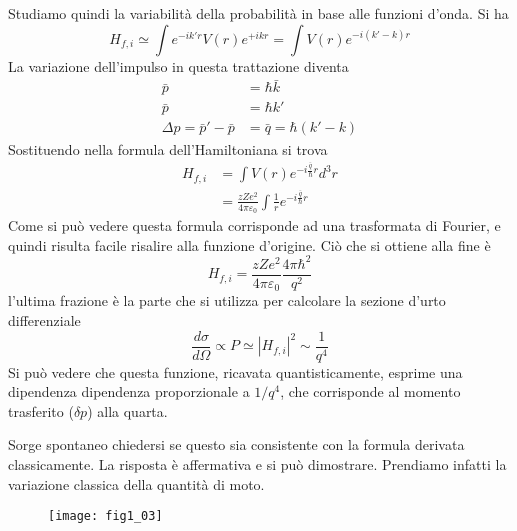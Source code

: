 Studiamo quindi la variabilità della probabilità in base alle funzioni d'onda. 
Si ha
\begin{equation}
H_{f,i}\simeq \int e^{-ik'r} V(r)e^{+ikr}=\int V(r)e^{-i(k'-k)r}
\end{equation}
La variazione dell'impulso in questa trattazione diventa  
\begin{equation}
\begin{split}
\bar p &=\hbar \bar k\\
\bar p &=\hbar k'\\ 
\Delta p =\bar p' -\bar p&=\bar q=\hbar (k'-k)
\end{split}
\end{equation}
Sostituendo nella formula dell'Hamiltoniana si trova
\begin{equation}
\begin{split}
H_{f,i}&=\int V(r) e^{-i\frac{\bar q}{\hbar}r}d^3r\\
&=\frac{zZe^2}{4\pi\varepsilon_0}\int \frac{1}{r}e^{-i\frac{\bar q}{\hbar}r}
\end{split}
\end{equation}
Come si può vedere questa formula corrisponde ad una trasformata di Fourier, e quindi risulta facile risalire alla funzione d'origine. Ciò che si ottiene alla fine è
\begin{equation}
H_{f,i}=\frac{zZe^2}{4\pi\varepsilon_0}\frac{4\pi\hbar^2}{q^2}
\end{equation}
l'ultima frazione è la parte che si utilizza per calcolare la sezione d'urto differenziale
\begin{equation}
\frac{d\sigma}{d\Omega}\propto P\simeq |H_{f,i}|^2\sim\frac{1}{q^4}
\end{equation}
Si può vedere che questa funzione, ricavata quantisticamente, esprime una dipendenza dipendenza proporzionale a $1/q^4$, che corrisponde al momento trasferito ($\delta p$) alla quarta.
 
Sorge spontaneo chiedersi se questo sia consistente con la formula derivata classicamente. La risposta è affermativa e si può dimostrare. Prendiamo infatti la variazione classica della quantità di moto.

\begin{figure}[h]
\centering
\texttt{[image: fig1\_03]}
\label{fig:1.3}
\end{figure}

